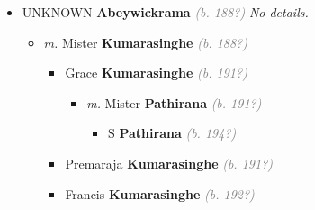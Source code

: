 \documentclass[10pt, openany]{book}
\begin{document}
\begin{itemize}
\item{UNKNOWN \textbf{Abeywickrama} \textcolor{gray}{\textit{(b. 188?)}} \textcolor{slmaroon}{\textit{No details.}}
\begin{itemize}
\item{\textit{m.} Mister \textbf{Kumarasinghe} \textcolor{gray}{\textit{(b. 188?)}}   \label{couple:00000013:00000497} \begin{itemize}
\item{Grace \textbf{Kumarasinghe} \textcolor{gray}{\textit{(b. 191?)}}
\begin{itemize}
\item{\textit{m.} Mister \textbf{Pathirana} \textcolor{gray}{\textit{(b. 191?)}}   \label{couple:00000496:00000584} \begin{itemize}
\item{S \textbf{Pathirana} \textcolor{gray}{\textit{(b. 194?)}}
 }
\end{itemize}}
\end{itemize}
 }
\item{Premaraja \textbf{Kumarasinghe} \textcolor{gray}{\textit{(b. 191?)}}
 }
\item{Francis \textbf{Kumarasinghe} \textcolor{gray}{\textit{(b. 192?)}}
 }
\end{itemize}}
\end{itemize}
 }
\end{itemize}
  
\end{document}
